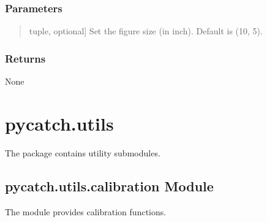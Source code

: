 \documentclass[letterpaper,10pt,english]{sphinxmanual}
\begin{document}
\begin{fulllineitems}
\begin{fulllineitems}
\subsubsection{Parameters}
\label{\detokenize{pycatch/pycatch:id37}}\begin{quote}
\begin{description}
\sphinxlineitem{fsize}{[}tuple, optional{]}
\sphinxAtStartPar
Set the figure size (in inch). Default is (10, 5).

\end{description}
\end{quote}


\subsubsection{Returns}
\label{\detokenize{pycatch/pycatch:id38}}
\sphinxAtStartPar
None

\end{fulllineitems}


\end{fulllineitems}


\sphinxstepscope


\section{pycatch.utils}
\label{\detokenize{pycatch/utils/index:pycatch-utils}}\label{\detokenize{pycatch/utils/index::doc}}
\sphinxAtStartPar
The  package contains utility submodules.

\sphinxstepscope


\subsection{pycatch.utils.calibration Module}
\label{\detokenize{pycatch/utils/calibration:pycatch-utils-calibration-module}}\label{\detokenize{pycatch/utils/calibration::doc}}
\sphinxAtStartPar
The  module provides calibration functions.

\label{\detokenize{pycatch/utils/calibration:module-pycatch.utils.calibration}}
\end{document}
